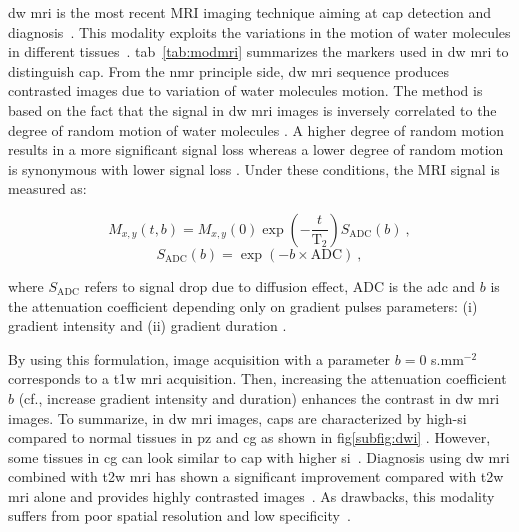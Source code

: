 \ac{dw} \ac{mri} is the most recent MRI imaging technique aiming at \ac{cap} detection and diagnosis~\cite{Scheidler1999}. This modality exploits the variations in the motion of water molecules in different tissues~\cite{LeBihan1988,Koh2007}. \Acl{tab}~\ref{tab:modmri} summarizes the markers used in \ac{dw} \ac{mri} to distinguish \ac{cap}. From the \ac{nmr} principle side, \ac{dw} \ac{mri} sequence produces contrasted images due to variation of water molecules motion. The method is based on the fact that the signal in \ac{dw} \ac{mri} images is inversely correlated to the degree of random motion of water molecules \cite{Huisman2003}. A higher degree of random motion results in a more significant signal loss whereas a lower degree of random motion is synonymous with lower signal loss \cite{Huisman2003}. Under these conditions, the MRI signal is measured as:

\begin{equation}
  M_{x,y}\left(t,b\right) = M_{x,y}(0) \exp \left( - \frac{t}{\text{T}_2} \right) S_{\text{ADC}}(b) \ , 
  \label{eq:t2dif}
\end{equation} 
\begin{equation} 
  S_{\text{ADC}}(b) = \exp \left( -b \times \text{ADC} \right) \ , 
  \label{eq:dif}
\end{equation}
 
\noindent where $S_{\text{ADC}}$ refers to signal drop due to diffusion effect, $\text{ADC}$ is the \acl{adc} and $b$ is the attenuation coefficient depending only on gradient pulses parameters: (i) gradient intensity and (ii) gradient duration \cite{LeBihan1986}. 

By using this formulation, image acquisition with a parameter $b=0$ s.mm$^{-2}$ corresponds to a \ac{t1w} \ac{mri} acquisition. Then, increasing the attenuation coefficient $b$ (cf., increase gradient intensity and duration) enhances the contrast in \ac{dw} \ac{mri} images. To summarize, in \ac{dw} \ac{mri} images, \acp{cap} are characterized by high-\ac{si} compared to normal tissues in \ac{pz} and \ac{cg} as shown in \acs{fig}\ref{subfig:dwi} \cite{Barentsz2012}. However, some tissues in \ac{cg} can look similar to \ac{cap} with higher \ac{si}~\cite{Barentsz2012}. Diagnosis using \ac{dw} \ac{mri} combined with \ac{t2w} \ac{mri} has shown a significant improvement compared with \ac{t2w} \ac{mri} alone and provides highly contrasted images~\cite{Shimofusa2005,Padhani2011,Choi2007}. As drawbacks, this modality suffers from poor spatial resolution and low specificity~\cite{Choi2007}.


